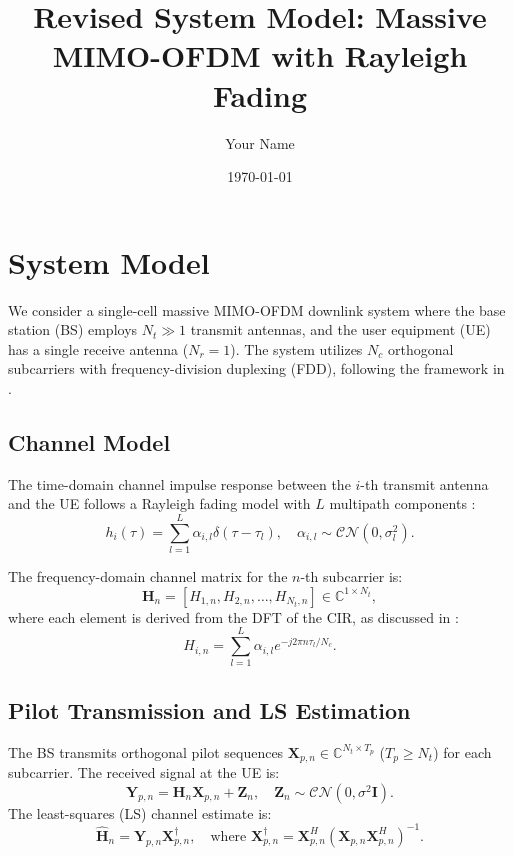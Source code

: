 \documentclass[10pt]{article}
\title{Revised System Model: Massive MIMO-OFDM with Rayleigh Fading}
\author{Your Name}
\date{\today}
\begin{document}
\maketitle

\section{System Model}
\label{sec:system_model}

We consider a single-cell massive MIMO-OFDM downlink system where the base station (BS) employs \(N_t \gg 1\) transmit antennas, and the user equipment (UE) has a single receive antenna (\(N_r = 1\)). The system utilizes \(N_c\) orthogonal subcarriers with frequency-division duplexing (FDD), following the framework in \cite{abc}. 

\subsection{Channel Model}
The time-domain channel impulse response between the \(i\)-th transmit antenna and the UE follows a Rayleigh fading model with \(L\) multipath components \cite{tse2005fundamentals}:
\begin{equation}
h_i(\tau) = \sum_{l=1}^L \alpha_{i,l} \delta(\tau - \tau_l), \quad \alpha_{i,l} \sim \mathcal{CN}(0, \sigma_l^2).
\end{equation}

The frequency-domain channel matrix for the \(n\)-th subcarrier is:
\begin{equation}
\mathbf{H}_n = \left[H_{1,n}, H_{2,n}, \dots, H_{N_t,n}\right] \in \mathbb{C}^{1 \times N_t},
\end{equation}
where each element is derived from the DFT of the CIR, as discussed in \cite{heath2018foundations}:
\begin{equation}
H_{i,n} = \sum_{l=1}^L \alpha_{i,l} e^{-j 2\pi n \tau_l / N_c}.
\end{equation}

\subsection{Pilot Transmission and LS Estimation}
The BS transmits orthogonal pilot sequences \(\mathbf{X}_{p,n} \in \mathbb{C}^{N_t \times T_p}\) (\(T_p \geq N_t\)) for each subcarrier. The received signal at the UE is:
\begin{equation}
\mathbf{Y}_{p,n} = \mathbf{H}_n \mathbf{X}_{p,n} + \mathbf{Z}_n, \quad \mathbf{Z}_n \sim \mathcal{CN}(0, \sigma^2 \mathbf{I}).
\end{equation}
The least-squares (LS) channel estimate is:
\begin{equation}
\hat{\mathbf{H}}_n = \mathbf{Y}_{p,n} \mathbf{X}_{p,n}^\dagger, \quad \text{where } \mathbf{X}_{p,n}^\dagger = \mathbf{X}_{p,n}^H (\mathbf{X}_{p,n} \mathbf{X}_{p,n}^H)^{-1}.
\end{equation}
\end{document}
